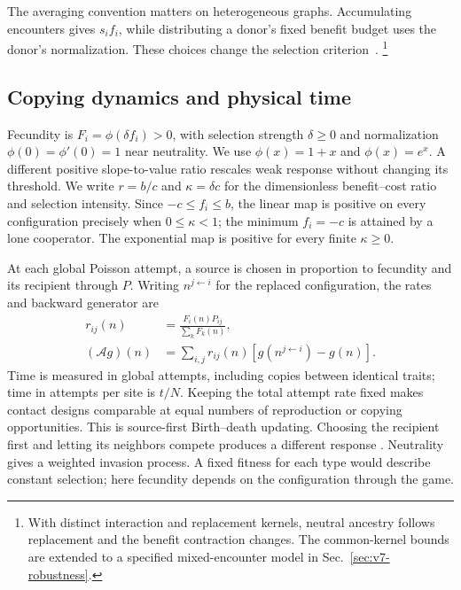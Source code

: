\documentclass[aps,pre,reprint,amsmath,amssymb,longbibliography]{revtex4-2}
\begin{document}
The averaging convention matters on heterogeneous graphs. Accumulating
encounters gives $s_i f_i$, while distributing a donor's fixed benefit
budget uses the donor's normalization. These choices change the
selection criterion~\cite{McAvoyAllenNowak2020,McAvoyRaoHauert2021}.
\footnote{With distinct interaction and replacement kernels, neutral
ancestry follows replacement and the benefit contraction changes. The common-kernel bounds are extended to a specified mixed-encounter model in Sec.~\ref{sec:v7-robustness}.}

\subsection{Copying dynamics and physical time}
\label{sec:update}
Fecundity is $F_i=\phi(\delta f_i)>0$, with selection strength
$\delta\ge0$ and normalization $\phi(0)=\phi'(0)=1$ near
neutrality. We use $\phi(x)=1+x$ and $\phi(x)=e^x$.
A different positive slope-to-value ratio
rescales weak response without changing its threshold.
We write $r=b/c$ and $\kappa=\delta c$ for the dimensionless
benefit--cost ratio and selection intensity. Since $-c\le f_i\le b$,
the linear map is positive on every configuration precisely when
 $0\le\kappa<1$; the minimum $f_i=-c$ is attained by a lone
cooperator. The exponential map is positive for every finite $\kappa\ge0$.

At each global Poisson attempt, a source is chosen in proportion to
fecundity and its recipient through $P$. Writing $n^{j\leftarrow i}$
for the replaced configuration, the rates and backward generator are
\begin{align}
 r_{ij}(n)&=\frac{F_i(n)P_{ij}}{\sum_kF_k(n)},\label{eq:rates}\\
 (\mathcal A g)(n)&=\sum_{i,j}r_{ij}(n)
       [g(n^{j\leftarrow i})-g(n)] .
 \label{eq:backward}
\end{align}
Time is measured in global attempts, including copies between identical
traits; time in attempts per site is $t/N$.
Keeping the total attempt rate fixed makes contact designs comparable
at equal numbers of reproduction or copying opportunities. This is source-first
Birth--death updating. Choosing the recipient first and letting its
neighbors compete produces a different response
\cite{OhtsukiEtAl2006,AllenLippnerNowak2019}. Neutrality gives a weighted
invasion process. A fixed fitness for each type would describe constant
selection; here fecundity depends on the configuration through the game.
\end{document}
